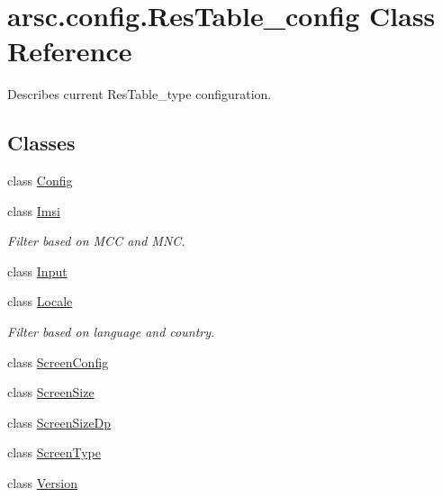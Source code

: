 \hypertarget{classarsc_1_1config_1_1ResTable__config}{}\section{arsc.\+config.\+Res\+Table\+\_\+config Class Reference}
\label{classarsc_1_1config_1_1ResTable__config}


Describes current Res\+Table\+\_\+type configuration.  


\subsection*{Classes}
\begin{DoxyCompactItemize}
\item 
class \mbox{\hyperlink{classarsc_1_1config_1_1ResTable__config_1_1Config}{Config}}
\item 
class \mbox{\hyperlink{classarsc_1_1config_1_1ResTable__config_1_1Imsi}{Imsi}}
\begin{DoxyCompactList}\small\item\em Filter based on M\+CC and M\+NC. \end{DoxyCompactList}\item 
class \mbox{\hyperlink{classarsc_1_1config_1_1ResTable__config_1_1Input}{Input}}
\item 
class \mbox{\hyperlink{classarsc_1_1config_1_1ResTable__config_1_1Locale}{Locale}}
\begin{DoxyCompactList}\small\item\em Filter based on language and country. \end{DoxyCompactList}\item 
class \mbox{\hyperlink{classarsc_1_1config_1_1ResTable__config_1_1ScreenConfig}{Screen\+Config}}
\item 
class \mbox{\hyperlink{classarsc_1_1config_1_1ResTable__config_1_1ScreenSize}{Screen\+Size}}
\item 
class \mbox{\hyperlink{classarsc_1_1config_1_1ResTable__config_1_1ScreenSizeDp}{Screen\+Size\+Dp}}
\item 
class \mbox{\hyperlink{classarsc_1_1config_1_1ResTable__config_1_1ScreenType}{Screen\+Type}}
\item 
class \mbox{\hyperlink{classarsc_1_1config_1_1ResTable__config_1_1Version}{Version}}
\end{DoxyCompactItemize}

